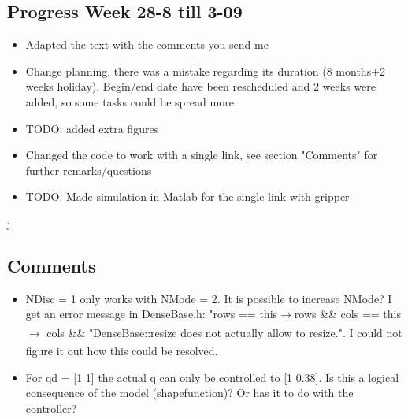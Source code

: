 \subsection*{Progress Week 28-8 till 3-09 }


\begin{itemize}
    \item Adapted the text with the comments you send me
    \item Change planning, there was a mistake regarding its duration (8 months+2 weeks holiday). Begin/end date have been rescheduled and 2 weeks were added, so some tasks could be spread more
    \item TODO: added extra figures
    \item Changed the code to work with a single link, see section "Comments" for further remarks/questions
    \item TODO: Made simulation in Matlab for the single link with gripper
\end{itemize}j




\subsection*{Comments}

\begin{itemize}
    \item NDisc = 1 only works with NMode = 2. It is possible to increase NMode? I get an error message in DenseBase.h: "rows == this$\xrightarrow[]{}$rows\(\) \&\& cols == this$\xrightarrow[]{}$ cols\(\) \&\& "DenseBase::resize\(\) does not actually allow to resize.". I could not figure it out how this could be resolved.
    \item For qd = [1 1] the actual q can only be controlled to [1 0.38]. Is this a logical consequence of the model (shapefunction)? Or has it to do with the controller?


\end{itemize}




